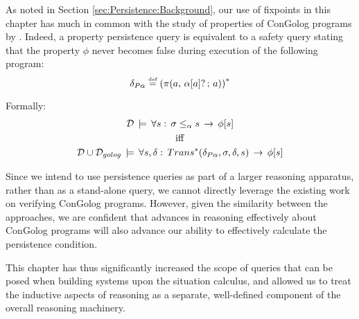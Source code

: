 As noted in Section \ref{sec:Persistence:Background}, our use of
fixpoints in this chapter has much in common with the study of properties
of ConGolog programs by \citep{ternovska97congolog_fixpoint,classen08golog_properties}.
Indeed, a property persistence query is equivalent to a safety query
stating that the property $\phi$ never becomes false during execution
of the following program:\[
\delta_{P\alpha}\stackrel{\mbox{\tiny def}}{=}\left(\pi(a,\,\alpha[a]?\,;\, a)\right)^{*}\]


Formally:\begin{gather*}
\mathcal{D}\,\models\,\forall s:\,\sigma\leq_{\alpha}s\,\rightarrow\,\phi[s]\\
\mathrm{iff}\\
\mathcal{D}\cup\mathcal{D}_{golog}\,\models\,\forall s,\delta:\, Trans^{*}(\delta_{P\alpha},\sigma,\delta,s)\,\rightarrow\,\phi[s]\end{gather*}


Since we intend to use persistence queries as part of a larger reasoning
apparatus, rather than as a stand-alone query, we cannot directly
leverage the existing work on verifying ConGolog programs. However,
given the similarity between the approaches, we are confident that
advances in reasoning effectively about ConGolog programs will also
advance our ability to effectively calculate the persistence condition.

This chapter has thus significantly increased the scope of queries
that can be posed when building systems upon the situation calculus,
and allowed us to treat the inductive aspects of reasoning as a separate,
well-defined component of the overall reasoning machinery.

